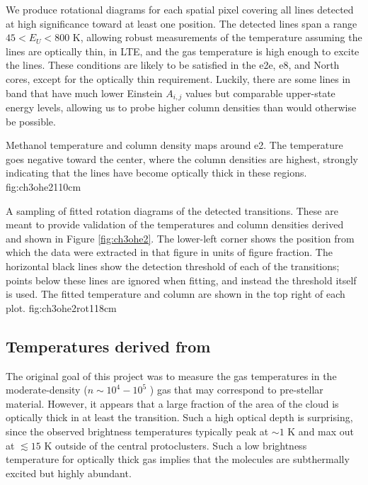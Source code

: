 \documentclass{aa}
\begin{document}
We produce rotational diagrams for each spatial pixel covering all \methanol lines
detected at high significance toward at least one position.  The detected lines
span a range $45 < E_U < 800$ K, allowing robust measurements of the temperature
assuming the lines are optically thin, in LTE, and the gas temperature is high
enough to excite the lines.  These conditions are likely to be satisfied in the
e2e, e8, and North cores, except for the optically thin requirement.  Luckily,
there are some lines in band that have much lower Einstein $A_{i,j}$ values
but comparable upper-state energy levels, allowing us to probe higher column
densities than would otherwise be possible.

{Methanol temperature and column density maps around e2.  The temperature goes
negative toward the center, where the column densities are highest, strongly
indicating that the lines have become optically thick in these regions.}
{fig:ch3ohe2}{1}{10cm}

{A sampling of fitted rotation diagrams of the detected \methanol transitions.
These are meant to provide validation of the temperatures and column densities
derived and shown in Figure \ref{fig:ch3ohe2}.  The lower-left corner shows
the position from which the data were extracted in that figure in units of
figure fraction.  The horizontal black lines show the detection threshold of each
of the transitions; points below these lines are ignored when fitting, and instead
the threshold itself is used.  The fitted temperature and
column are shown in the top right of each plot.
}{fig:ch3ohe2rot}{1}{18cm}
 
\clearpage

\subsection{Temperatures derived from \formaldehyde}
The original goal of this project was to measure the gas temperatures in the
moderate-density ($n\sim10^4-10^5$ \percc) gas that may correspond to
pre-stellar material.  However, it appears that a large fraction of the area
of the cloud is optically thick in at least the \formaldehyde \threeohthree
transition.  Such a high optical depth is surprising, since the observed
brightness temperatures typically peak at $\sim1$ K and max out at $\lesssim15$
K outside of the central protoclusters.  Such a low brightness temperature for 
optically thick gas implies that the molecules are subthermally excited
but highly abundant.
\end{document}
